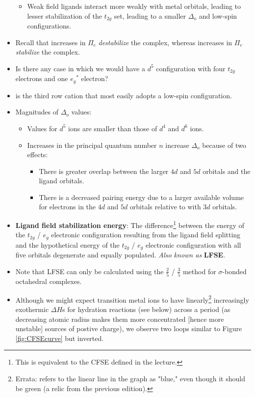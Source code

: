 \documentclass[../notes.tex]{subfiles}
\begin{document}
\begin{itemize}
    \begin{itemize}
        \item Weak field ligands interact more weakly with metal orbitals, leading to lesser stabilization of the $t_{2g}$ set, leading to a smaller $\Delta_o$ and low-spin configurations.
    \end{itemize}
    \item Recall that increases in $\Pi_c$ \emph{destabilize} the complex, whereas increases in $\Pi_e$ \emph{stabilize} the complex.
    \item Is there any case in which we would have a $d^5$ configuration with four $t_{2g}$ electrons and one ${e_g}^*$ electron?
    \item {} is the third row cation that most easily adopts a low-spin configuration.
    \item Magnitudes of $\Delta_o$ values:
    \begin{itemize}
        \item Values for $d^5$ ions are smaller than those of $d^4$ and $d^6$ ions.
        \item Increases in the principal quantum number $n$ increase $\Delta_o$ because of two effects:
        \begin{itemize}
            \item There is greater overlap between the larger $4d$ and $5d$ orbitals and the ligand orbitals.
            \item There is a decreased pairing energy due to a larger available volume for electrons in the $4d$ and $5d$ orbitals relative to with $3d$ orbitals.
        \end{itemize}
    \end{itemize}
    \item \textbf{Ligand field stabilization energy}: The difference\footnote{This is equivalent to the CFSE defined in the lecture.} between the energy of the $t_{2g}$ / $e_g$ electronic configuration resulting from the ligand field splitting and the hypothetical energy of the $t_{2g}$ / $e_g$ electronic configuration with all five orbitals degenerate and equally populated. \emph{Also known as} \textbf{LFSE}.
    \item Note that LFSE can only be calculated using the $\frac{2}{5}$ / $\frac{3}{5}$ method for $\sigma$-bonded octahedral complexes.
    \item Although we might expect transition metal ions to have linearly\footnote{Errata: \textcite{bib:MiesslerFischerTarr} refers to the linear line in the graph as "blue," even though it should be green (a relic from the previous edition).} increasingly exothermic $\Delta H$s for hydration reactions (see below) across a period (as decreasing atomic radius makes them more concentrated [hence more unstable] sources of postive charge), we observe two loops similar to Figure \ref{fig:CFSEcurve} but inverted.

\end{itemize}
\end{document}
